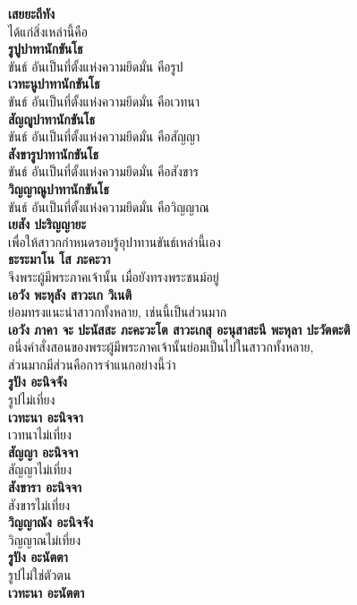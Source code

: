 \documentclass[12pt]{article}
\begin{document}
\textbf{เสยยะถีทัง\\}
\indent ได้แก่สิ่งเหล่านี้คือ\\
\textbf{รูปูปาทานักขันโธ\\}
\indent ขันธ์ อันเป็นที่ตั้งแห่งความยึดมั่น คือรูป\\
\textbf{เวทะนูปาทานักขันโธ\\}
\indent ขันธ์ อันเป็นที่ตั้งแห่งความยึดมั่น คือเวทนา\\
\textbf{สัญญูปาทานักขันโธ\\}
\indent ขันธ์ อันเป็นที่ตั้งแห่งความยึดมั่น คือสัญญา\\
\textbf{สังขารูปาทานักขันโธ\\}
\indent ขันธ์ อันเป็นที่ตั้งแห่งความยึดมั่น คือสังขาร\\
\textbf{วิญญาณูปาทานักขันโธ\\}
\indent ขันธ์ อันเป็นที่ตั้งแห่งความยึดมั่น คือวิญญาณ\\
\textbf{เยสัง ปะริญญายะ\\}
\indent เพื่อให้สาวกกำหนดรอบรู้อุปาทานขันธ์เหล่านี้เอง\\
\textbf{ธะระมาโน โส ภะคะวา\\}
\indent จึงพระผู้มีพระภาคเจ้านั้น เมื่อยังทรงพระชนม์อยู่\\
\textbf{เอวัง พะหุลัง สาวะเก วิเนติ\\}
\indent ย่อมทรงแนะนำสาวกทั้งหลาย, เช่นนี้เป็นส่วนมาก\\
\textbf{เอวัง ภาคา จะ ปะนัสสะ ภะคะวะโต สาวะเกสุ อะนุสาสะนี พะหุลา ปะวัตตะติ\\}
\indent อนึ่งคำสั่งสอนของพระผู้มีพระภาคเจ้านั้นย่อมเป็นไปในสาวกทั้งหลาย,\\
\indent ส่วนมากมีส่วนคือการจำแนกอย่างนี้ว่า\\
\textbf{รูปัง อะนิจจัง\\}
\indent รูปไม่เที่ยง\\
\textbf{เวทะนา อะนิจจา\\}
\indent เวทนาไม่เที่ยง\\
\textbf{สัญญา อะนิจจา\\}
\indent สัญญาไม่เที่ยง\\
\textbf{สังขารา อะนิจจา\\}
\indent สังขารไม่เที่ยง\\
\textbf{วิญญาณัง อะนิจจัง\\}
\indent วิญญาณไม่เที่ยง\\
\textbf{รูปัง อะนัตตา\\}
\indent รูปไม่ใช่ตัวตน\\
\textbf{เวทะนา อะนัตตา\\}
\end{document}
